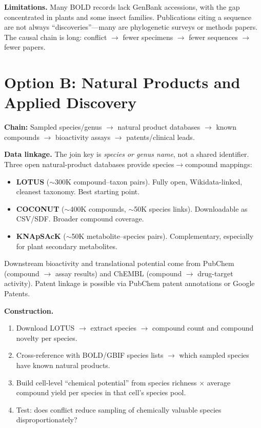 \documentclass[10pt]{article}
\begin{document}
\textbf{Limitations.} Many BOLD records lack GenBank accessions, with the gap concentrated in plants and some insect families. Publications citing a sequence are not always ``discoveries''---many are phylogenetic surveys or methods papers. The causal chain is long: conflict $\to$ fewer specimens $\to$ fewer sequences $\to$ fewer papers.

\section*{Option B: Natural Products and Applied Discovery}

\textbf{Chain:} Sampled species/genus $\to$ natural product databases $\to$ known compounds $\to$ bioactivity assays $\to$ patents/clinical leads.

\textbf{Data linkage.} The join key is \emph{species or genus name}, not a shared identifier. Three open natural-product databases provide species$\to$compound mappings:
\begin{itemize}
    \item \textbf{LOTUS} ($\sim$300K compound--taxon pairs). Fully open, Wikidata-linked, cleanest taxonomy. Best starting point.
    \item \textbf{COCONUT} ($\sim$400K compounds, $\sim$50K species links). Downloadable as CSV/SDF. Broader compound coverage.
    \item \textbf{KNApSAcK} ($\sim$50K metabolite--species pairs). Complementary, especially for plant secondary metabolites.
\end{itemize}
Downstream bioactivity and translational potential come from PubChem (compound $\to$ assay results) and ChEMBL (compound $\to$ drug-target activity). Patent linkage is possible via PubChem patent annotations or Google Patents.

\textbf{Construction.}
\begin{enumerate}
    \item Download LOTUS $\to$ extract species $\to$ compound count and compound novelty per species.
    \item Cross-reference with BOLD/GBIF species lists $\to$ which sampled species have known natural products.
    \item Build cell-level ``chemical potential'' from species richness $\times$ average compound yield per species in that cell's species pool.
    \item Test: does conflict reduce sampling of chemically valuable species disproportionately?
\end{enumerate}
\end{document}
